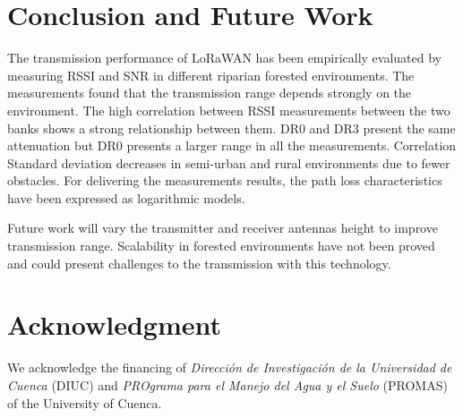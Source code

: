 

\section{Conclusion and Future Work}

The transmission performance of LoRaWAN has been empirically evaluated by measuring RSSI and SNR in different riparian forested environments. The measurements found that the transmission range depends strongly on the environment. The high correlation between RSSI measurements between the two banks shows a strong relationship between them. DR$0$ and DR$3$ present the same attenuation but DR$0$ presents a larger range in all the measurements. Correlation Standard deviation decreases in semi-urban and rural environments due to fewer obstacles. For delivering the measurements results, the path loss characteristics have been expressed as logarithmic models.

Future work will vary the transmitter and receiver antennas height to improve transmission range. Scalability in forested environments have not been proved and could present challenges to the transmission with this technology. 

\section*{Acknowledgment}

We acknowledge the financing of \textit{Dirección de Investigación de la Universidad de Cuenca} (DIUC) and \textit{PROgrama para el Manejo del Agua y el Suelo} (PROMAS) of the University of Cuenca.






